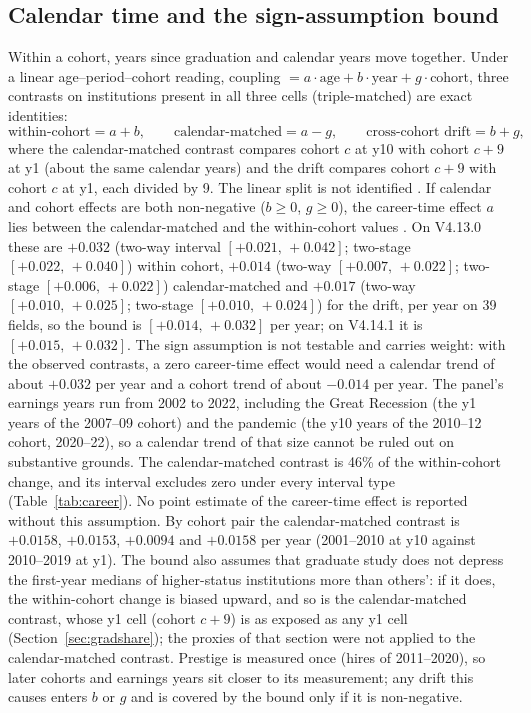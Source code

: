 \documentclass[11pt]{article}
\newcommand{\ci}[2]{$[#1,\allowbreak\,#2]$}
\begin{document}
\subsection{Calendar time and the sign-assumption bound}\label{sec:apc}

Within a cohort, years since graduation and calendar years move together. Under a linear age--period--cohort
reading, coupling $=a\cdot\text{age}+b\cdot\text{year}+g\cdot\text{cohort}$, three contrasts on institutions present
in all three cells (triple-matched) are exact identities:
\begin{equation}
\text{within-cohort}=a+b,\qquad \text{calendar-matched}=a-g,\qquad \text{cross-cohort drift}=b+g,\label{eq:apc}
\end{equation}
where the calendar-matched contrast compares cohort $c$ at y10 with cohort $c+9$ at y1 (about the same calendar
years) and the drift compares cohort $c+9$ with cohort $c$ at y1, each divided by 9. The linear split is not
identified \citep{fosse2019analyzing}. If calendar and cohort effects are both non-negative ($b\ge0$, $g\ge0$), the
career-time effect $a$ lies between the calendar-matched and the within-cohort values \citep{fosse2019bounding}. On
V4.13.0 these are $+0.032$ (two-way interval \ci{+0.021}{+0.042}; two-stage \ci{+0.022}{+0.040}) within cohort,
$+0.014$ (two-way \ci{+0.007}{+0.022}; two-stage \ci{+0.006}{+0.022}) calendar-matched and $+0.017$ (two-way
\ci{+0.010}{+0.025}; two-stage \ci{+0.010}{+0.024}) for the drift, per year on 39 fields, so the bound is
$[+0.014,\,+0.032]$ per year; on V4.14.1 it is $[+0.015,\,+0.032]$. The sign assumption is not testable and
carries weight: with the observed contrasts, a zero career-time effect would need a calendar trend of about
$+0.032$ per year and a cohort trend of about $-0.014$ per year. The panel's earnings years run from 2002 to
2022, including the Great Recession (the y1 years of the 2007--09 cohort) and the pandemic (the y10 years of the
2010--12 cohort, 2020--22), so a calendar trend of that size cannot be ruled out on substantive grounds. The calendar-matched contrast is 46\% of the within-cohort change, and its
interval excludes zero under every interval type (Table~\ref{tab:career}). No point estimate of the career-time
effect is reported without this assumption. By cohort pair the calendar-matched contrast is $+0.0158$, $+0.0153$,
$+0.0094$ and $+0.0158$ per year (2001--2010 at y10 against 2010--2019 at y1). The bound also assumes that
graduate study does not depress the first-year medians of higher-status institutions more than others': if it
does, the within-cohort change is biased upward, and so is the calendar-matched contrast, whose y1 cell (cohort
$c+9$) is as exposed as any y1 cell (Section~\ref{sec:gradshare}); the proxies of that section were not applied to
the calendar-matched contrast. Prestige is measured once (hires of 2011--2020), so later cohorts and earnings years
sit closer to its measurement; any drift this causes enters $b$ or $g$ and is covered by the bound only if it is
non-negative.
\end{document}
